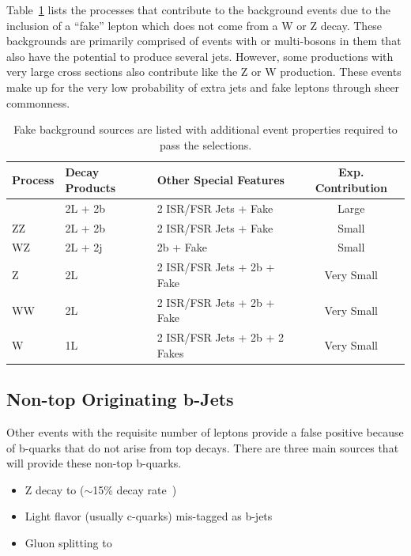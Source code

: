 	


	Table~\ref{tab:fake_bkg} lists the processes that contribute to the background events due to the inclusion of a ``fake'' lepton which does not come from a W or Z decay. These backgrounds are primarily comprised of events with \ttbar or multi-bosons in them that also have the potential to produce several jets. However, some productions with very large cross sections also contribute like the Z or W production. These events make up for the very low probability of extra jets and fake leptons through sheer commonness.
			
	\begin{table}[hbt]
	\caption{\label{tab:fake_bkg} Fake background sources are listed with additional event properties required to pass the selections.}
	\begin{center}
	\begin{tabular}{l|ll|c}\hline\hline %
	Process & Decay Products & Other Special Features & Exp. Contribution\\
	\hline
	\ttbar & 2L + 2b & 2 ISR/FSR Jets + Fake & Large\\
	ZZ & 2L + 2b & 2 ISR/FSR Jets + Fake & Small\\
	WZ & 2L + 2j & 2b + Fake & Small\\
	Z & 2L & 2 ISR/FSR Jets + 2b + Fake & Very Small\\
	WW & 2L & 2 ISR/FSR Jets + 2b + Fake & Very Small\\
	W & 1L & 2 ISR/FSR Jets + 2b + 2 Fakes & Very Small\\
	\hline \hline
	\end{tabular}
	
	\end{center}
	\end{table}



\subsection{Non-top Originating b-Jets}
Other events with the requisite number of leptons provide a false positive because of b-quarks that do not arise from top decays. There are three main sources that will provide these non-top b-quarks.
\begin{itemize}
\item Z decay to \bbbar ($\sim$15\% decay rate~\cite{pdg})
\item Light flavor (usually c-quarks) mis-tagged as b-jets
\item Gluon splitting to \bbbar
\end{itemize}

